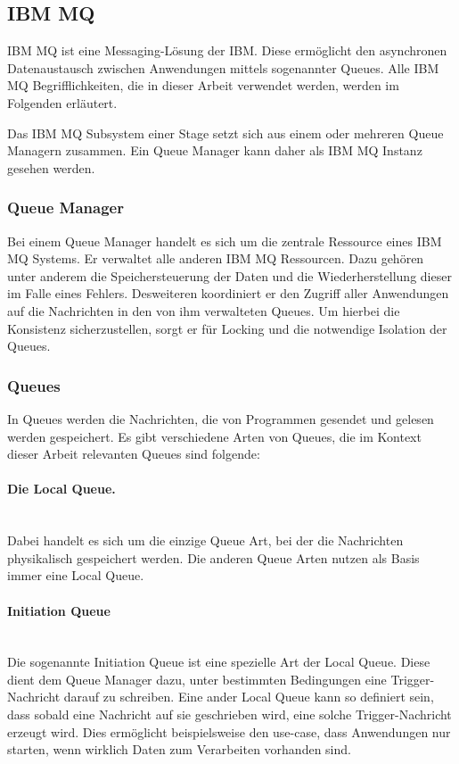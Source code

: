 \subsection{IBM MQ}\label{sec:mq}
IBM MQ ist eine Messaging-Lösung der IBM.
Diese ermöglicht den asynchronen Datenaustausch zwischen Anwendungen mittels sogenannter Queues.
Alle IBM MQ Begrifflichkeiten, die in dieser Arbeit verwendet werden, werden im Folgenden erläutert.
\cite{Aranha.2013}

Das IBM MQ Subsystem einer Stage setzt sich aus einem oder mehreren Queue Managern zusammen.
Ein Queue Manager kann daher als IBM MQ Instanz gesehen werden.

\subsubsection{Queue Manager}
Bei einem Queue Manager handelt es sich um die zentrale Ressource eines IBM MQ Systems.
Er verwaltet  alle anderen IBM MQ Ressourcen.
Dazu gehören unter anderem die Speichersteuerung der Daten und die Wiederherstellung dieser im Falle eines Fehlers.
Desweiteren koordiniert er den Zugriff aller Anwendungen auf die Nachrichten in den von ihm verwalteten Queues.
Um hierbei die Konsistenz sicherzustellen, sorgt er für Locking und die notwendige Isolation der Queues.
\cite{Aranha.2013}

\subsubsection{Queues}
In Queues werden die Nachrichten, die von Programmen gesendet und gelesen werden gespeichert.
Es gibt verschiedene Arten von Queues, die im Kontext dieser Arbeit relevanten Queues sind folgende:

\paragraph{Die Local Queue.}~\\
Dabei handelt es sich um die einzige Queue Art, bei der die Nachrichten physikalisch gespeichert werden.
Die anderen Queue Arten nutzen als Basis immer eine Local Queue.

\paragraph{Initiation Queue}~\\
Die sogenannte \glqq Initiation Queue\grqq{} ist eine spezielle Art der Local Queue.
Diese dient dem Queue Manager dazu, unter bestimmten Bedingungen eine Trigger-Nachricht darauf zu schreiben.
Eine ander Local Queue kann so definiert sein, dass sobald eine Nachricht auf sie geschrieben wird, eine solche Trigger-Nachricht erzeugt wird.
Dies ermöglicht beispielsweise den use-case, dass Anwendungen nur starten, wenn wirklich Daten zum Verarbeiten vorhanden sind.
\cite{Aranha.2013}


